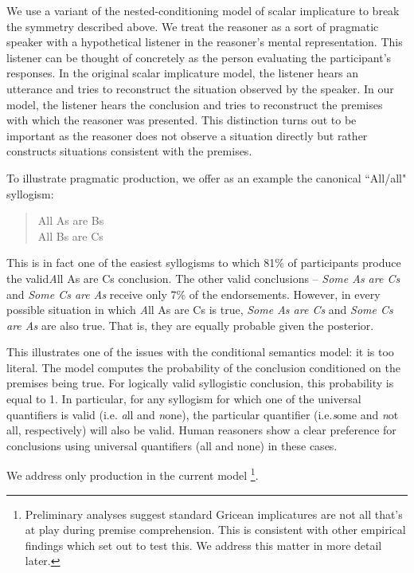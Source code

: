 \documentclass[10pt,letterpaper]{article}
\begin{document}
We use a variant of the nested-conditioning model of scalar implicature \cite{Goodman2013} to break the symmetry described above. We treat the reasoner as a sort of pragmatic speaker with a hypothetical listener in the reasoner's mental representation. This listener can be thought of concretely as the person evaluating the participant's responses. In the original scalar implicature model, the listener hears an utterance and tries to reconstruct the situation observed by the speaker. In our model, the listener hears the conclusion and tries to reconstruct the premises with which the reasoner was presented. This distinction turns out to be important as the reasoner does not observe a situation directly but rather constructs situations consistent with the premises. 




To illustrate pragmatic production, we offer as an example the canonical ``All/all" syllogism:

\begin{quotation}
All As are Bs \\
All Bs are Cs \\
\end{quotation}

This is in fact one of the easiest syllogisms to which 81\% of participants produce the valid{\emph All As are Cs} conclusion. The other valid conclusions -- \emph{Some As are Cs} and \emph{Some Cs are As} receive only 7\% of the endorsements. However, in every possible situation in which {\emph All As are Cs} is true, \emph{Some As are Cs} and \emph{Some Cs are As} are also true. That is, they are equally probable given the posterior. 

This illustrates one of the issues with the conditional semantics model: it is too literal. The model computes the probability of the conclusion conditioned on the premises being true. For logically valid syllogistic conclusion, this probability is equal to 1. In particular, for any syllogism for which one of the universal quantifiers is valid (i.e. {\emph all} and {\emph none}), the particular quantifier (i.e.{\emph some} and {\emph not all}, respectively) will also be valid. Human reasoners show a clear preference for conclusions using universal quantifiers (all and none) in these cases. 






We address only production in the current model \footnote{Preliminary analyses suggest standard Gricean implicatures are not all that's at play during premise comprehension. This is consistent with other empirical findings which set out to test this. We address this matter in more detail later.}.
\end{document}
